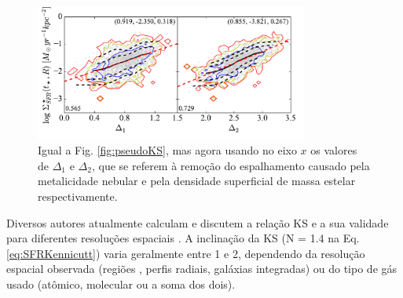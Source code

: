 \begin{figure}
	\centering
	\includegraphics[width=0.8\textwidth]{figuras/pseudoKS_noscat.pdf}
	\caption[A {\em pseudo-KS} sem os principais causadores de espalhamento.]
	{Igual a Fig. \ref{fig:pseudoKS}, mas agora usando no eixo $x$ os valores de $\Delta_1$ e
$\Delta_2$, que se referem à remoção do espalhamento causado pela metalicidade nebular e pela
densidade superficial de massa estelar respectivamente.}
	\label{fig:pseudoKS_noscat}
\end{figure}


Diversos autores atualmente calculam e discutem a relação KS e a sua validade para diferentes
resoluções espaciais \citep[e.g., ][]{Kennicutt.etal.2007a, Leroy.etal.2012a,
Calzetti.Liu.Koda.2012a, Lada.etal.2013a, Tacconi.etal.2013a, Casasola.etal.2015a}. A inclinação
da KS (N = 1.4 na Eq. \ref{eq:SFRKennicutt}) varia geralmente entre 1 e 2, dependendo da resolução
espacial observada (regiões \Hii, perfis radiais, galáxias integradas) ou do tipo de gás usado
(atômico, molecular ou a soma dos dois).

